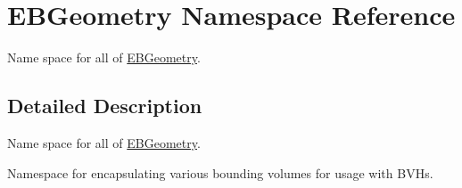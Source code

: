 \hypertarget{namespaceEBGeometry}{}\section{E\+B\+Geometry Namespace Reference}
\label{namespaceEBGeometry}


Name space for all of \hyperlink{namespaceEBGeometry}{E\+B\+Geometry}.  




\subsection{Detailed Description}
Name space for all of \hyperlink{namespaceEBGeometry}{E\+B\+Geometry}. 

Namespace for encapsulating various bounding volumes for usage with B\+V\+Hs. 